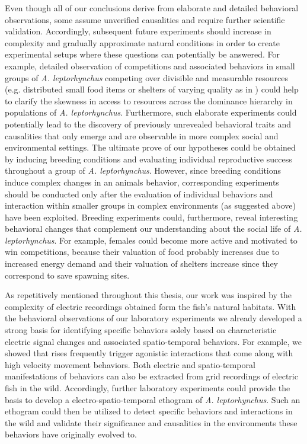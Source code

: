 \documentclass[11pt,pdftex]{article}
\newcommand{\lepto}{\textit{A. leptorhynchus}}
\begin{document}
Even though all of our conclusions derive from elaborate and detailed behavioral observations, some assume unverified causalities and require further scientific validation. Accordingly, subsequent future experiments should increase in complexity and gradually approximate natural conditions in order to create experimental setups where these questions can potentially be answered. For example, detailed observation of competitions and associated behaviors in small groups of \lepto{} competing over divisible and measurable resources (e.g. distributed small food items or shelters of varying quality as in \citet{Dunlap2002}) could help to clarify the skewness in access to resources across the dominance hierarchy in populations of \lepto{}. Furthermore, such elaborate experiments could potentially lead to the discovery of previously unrevealed behavioral traits and causalities that only emerge and are observable in more complex social and environmental settings. The ultimate prove of our hypotheses could be obtained by inducing breeding conditions and evaluating individual reproductive success throughout a group of \lepto{}. However, since breeding conditions induce complex changes in an animals behavior, corresponding experiments should be conducted only after the evaluation of individual behaviors and interaction within smaller groups in complex environments (as suggested above) have been exploited. Breeding experiments could, furthermore, reveal interesting behavioral changes that complement our understanding about the social life of \lepto{}. For example, females could become more active and motivated to win competitions, because their valuation of food probably increases due to increased energy demand and their valuation of shelters increase since they correspond to save spawning sites.

As repetitively mentioned throughout this thesis, our work was inspired by the complexity of electric recordings obtained form the fish's natural habitats. With the behavioral observations of our laboratory experiments we already developed a strong basis for identifying specific behaviors solely based on characteristic electric signal changes and associated spatio-temporal behaviors. For example, we showed that rises frequently trigger agonistic interactions that come along with high velocity movement behaviors. Both electric and spatio-temporal manifestations of behaviors can also be extracted from grid recordings of electric fish in the wild. Accordingly, further laboratory experiments could provide the basis to develop a electro-spatio-temporal ethogram of \lepto{}. Such an ethogram could then be utilized to detect specific behaviors and interactions in the wild and validate their significance and causalities in the environments these behaviors have originally evolved to.  



\end{document}
